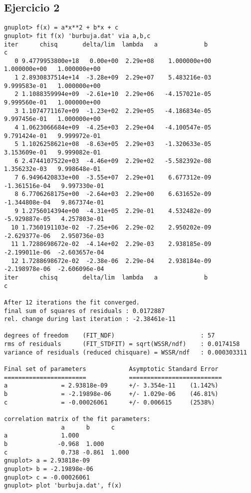 \subsection*{Ejercicio 2}
\begingroup
\fontsize{10pt}{12pt}\selectfont


\begin{verbatim}
gnuplot> f(x) = a*x**2 + b*x + c
gnuplot> fit f(x) 'burbuja.dat' via a,b,c
iter      chisq       delta/lim  lambda   a             b             c            
   0 9.4779953800e+18   0.00e+00  2.29e+08    1.000000e+00   1.000000e+00   1.000000e+00
   1 2.8930837514e+14  -3.28e+09  2.29e+07    5.483216e-03   9.999583e-01   1.000000e+00
   2 1.1088359994e+09  -2.61e+10  2.29e+06   -4.157021e-05   9.999560e-01   1.000000e+00
   3 1.1074771167e+09  -1.23e+02  2.29e+05   -4.186834e-05   9.997456e-01   1.000000e+00
   4 1.0623066684e+09  -4.25e+03  2.29e+04   -4.100547e-05   9.791424e-01   9.999972e-01
   5 1.1026258621e+08  -8.63e+05  2.29e+03   -1.320633e-05   3.153609e-01   9.999082e-01
   6 2.4744107522e+03  -4.46e+09  2.29e+02   -5.582392e-08   1.356232e-03   9.998648e-01
   7 6.9496420833e+00  -3.55e+07  2.29e+01    6.677312e-09  -1.361516e-04   9.997330e-01
   8 6.7706268175e+00  -2.64e+03  2.29e+00    6.631652e-09  -1.344808e-04   9.867374e-01
   9 1.2756014394e+00  -4.31e+05  2.29e-01    4.532482e-09  -5.929887e-05   4.257803e-01
  10 1.7360191103e-02  -7.25e+06  2.29e-02    2.950202e-09  -2.629377e-06   2.950736e-03
  11 1.7288698672e-02  -4.14e+02  2.29e-03    2.938185e-09  -2.199011e-06  -2.603657e-04
  12 1.7288698672e-02  -2.38e-06  2.29e-04    2.938184e-09  -2.198978e-06  -2.606096e-04
iter      chisq       delta/lim  lambda   a             b             c            

After 12 iterations the fit converged.
final sum of squares of residuals : 0.0172887
rel. change during last iteration : -2.38461e-11

degrees of freedom    (FIT_NDF)                        : 57
rms of residuals      (FIT_STDFIT) = sqrt(WSSR/ndf)    : 0.0174158
variance of residuals (reduced chisquare) = WSSR/ndf   : 0.000303311

Final set of parameters            Asymptotic Standard Error
=======================            ==========================
a               = 2.93818e-09      +/- 3.354e-11    (1.142%)
b               = -2.19898e-06     +/- 1.029e-06    (46.81%)
c               = -0.00026061      +/- 0.006615     (2538%)

correlation matrix of the fit parameters:
                a      b      c      
a               1.000 
b              -0.968  1.000 
c               0.738 -0.861  1.000 
gnuplot> a = 2.93818e-09
gnuplot> b = -2.19898e-06
gnuplot> c = -0.00026061
gnuplot> plot 'burbuja.dat', f(x)

\end{verbatim}
\endgroup